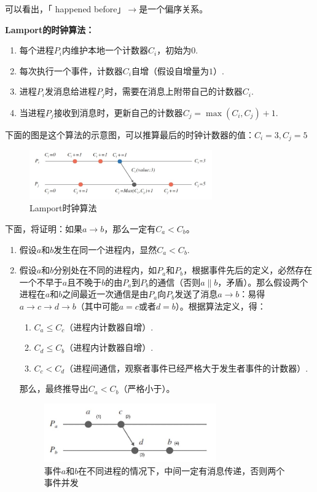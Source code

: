 \documentclass[cn,11pt,chinese]{elegantbook}
\begin{document}
可以看出，「 happened before」$\rightarrow$是一个偏序关系。

\textbf{Lamport的时钟算法：}

\begin{enumerate}
    \item 每个进程$P_i$内维护本地一个计数器$C_i$，初始为$0$.
    \item 每次执行一个事件，计数器$C_i$自增（假设自增量为$1$）.
    \item 进程$P_i$发消息给进程$P_j$时，需要在消息上附带自己的计数器$C_i$.
    \item 当进程$P_j$接收到消息时，更新自己的计数器$C_j = \max (C_i,C_j) + 1$.
\end{enumerate}

下面的图是这个算法的示意图，可以推算最后的时钟计数器的值：$C_i = 3, C_j = 5$

\begin{figure}
    \centering
    \includegraphics[width=0.7\textwidth]{images/appendix-a-10.jpeg}
    \caption{Lamport时钟算法}
\end{figure}

下面，将证明：如果$a \rightarrow b$，那么一定有$C_a < C_b$。

\begin{enumerate}
    \item 假设$a$和$b$发生在同一个进程内，显然$C_a < C_b$.
    \item 假设$a$和$b$分别处在不同的进程内，如$P_a$和$P_b$，根据事件先后的定义，必然存在一个不早于$a$且不晚于$b$的由$P_a$到$P_b$的通信（否则$a \parallel b$，矛盾）。那么假设两个进程在$a$和$b$之间最近一次通信是由$P_a$向$P_b$发送了消息$a \rightarrow b$：易得$a \rightarrow c \rightarrow d \rightarrow b$（其中可能$a = c$或者$d = b$）。根据算法定义，得：
    \begin{enumerate}
        \item $C_a \leq C_c$（进程内计数器自增）.
        \item $C_d \leq C_b$（进程内计数器自增）.
        \item $C_c < C_d$（进程间通信，观察者事件已经严格大于发生者事件的计数器）.
    \end{enumerate}
    那么，最终推导出$C_a < C_b$（严格小于）。

\begin{figure}
    \centering
    \includegraphics[width=0.7\textwidth]{images/appendix-a-11.jpeg}
    \caption{事件$a$和$b$在不同进程的情况下，中间一定有消息传递，否则两个事件并发}
\end{figure}

\end{enumerate}
\end{document}
